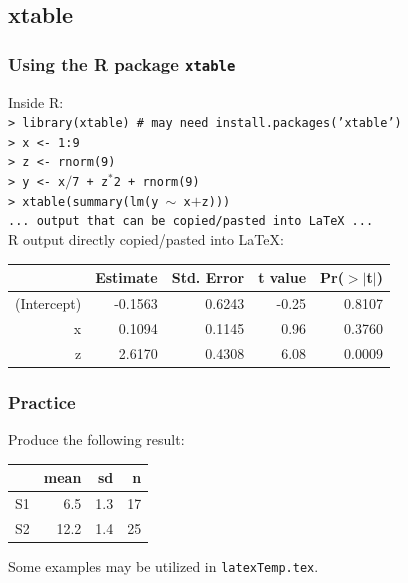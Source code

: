 \documentclass[slidestop,compress,mathserif]{beamer}
\begin{document}
\subsection[xtable]{xtable}
\begin{frame} \frametitle{Using the R package \texttt{xtable}} 
Inside R: \\
\vspace{0.3cm} \small
\hspace{0.3cm}\texttt{> library(xtable) \# may need install.packages('xtable')} \\
\hspace{0.3cm}\texttt{> x <- 1:9} \\
\hspace{0.3cm}\texttt{> z <- rnorm(9)} \\
\hspace{0.3cm}\texttt{> y <- x$/$7 + z$^*$2 + rnorm(9)} \\
\hspace{0.3cm}\texttt{> xtable(summary(lm(y $\sim$ x$+$z)))} \\
\hspace{0.3cm}\texttt{... output that can be copied/pasted into LaTeX ...} \\
\vspace{0.3cm} \normalsize
R output directly copied/pasted into LaTeX:
\begin{table}[ht]
\begin{center}
\begin{tabular}{rrrrr}
  \hline
 & Estimate & Std. Error & t value & Pr($>$$|$t$|$) \\
  \hline
(Intercept) & -0.1563 & 0.6243 & -0.25 & 0.8107 \\
  x & 0.1094 & 0.1145 & 0.96 & 0.3760 \\
  z & 2.6170 & 0.4308 & 6.08 & 0.0009 \\
   \hline
\end{tabular}
\end{center}
\end{table}
\end{frame}

\begin{frame} \frametitle{Practice}
	
	Produce the following result:
	\begin{center}
	\begin{tabular}{l rrr}
	\hline
	& mean & sd & n \\
	\hline
	S1 & 6.5 & 1.3 & 17 \\
	S2 & 12.2 & 1.4 & 25 \\
	\hline
	\end{tabular}
	\end{center}
	
	Some examples may be utilized in \texttt{\color{highlight}latexTemp.tex}.
	
\end{frame}
\end{document}
